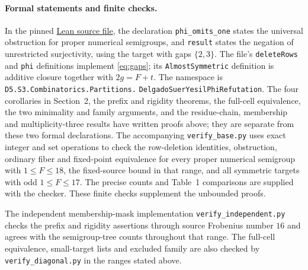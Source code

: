 \documentclass[11pt,a4paper]{article}
\theoremstyle{definition}
\theoremstyle{remark}
\begin{document}
\paragraph{Formal statements and finite checks.}
In the pinned \href{https://github.com/the-omega-institute/trureturing/blob/f960cb09514c99f42fd07398f5240a77378ea4db/D5/S3/Combinatorics/Partitions/DelgadoSuerYesilPhiRefutation.lean}{Lean source file},
the declaration \texttt{phi\_omits\_one} states the universal obstruction for
proper numerical semigroups, and \texttt{result} states the negation of
unrestricted surjectivity, using the target with gaps $\{2,3\}$.
The file's \texttt{deleteRows} and \texttt{phi} definitions implement
\eqref{eq:gaps}; its \texttt{AlmostSymmetric} definition is additive closure
together with $2g=F+t$. The namespace is
\texttt{D5.S3.Combinatorics.Partitions.}\allowbreak
\texttt{DelgadoSuerYesilPhiRefutation}.
The four corollaries in Section~2, the prefix and rigidity theorems,
the full-cell equivalence, the two minimality and family arguments,
and the residue-chain, membership and multiplicity-three results
have written proofs above; they are separate from these two formal declarations.
The accompanying \texttt{verify\_base.py} uses exact integer and set operations to
check the row-deletion identities, obstruction, ordinary fiber and fixed-point
equivalence for every proper numerical semigroup with $1\leq F\leq18$,
the fixed-source bound in that range, and all symmetric targets with odd
$1\leq F\leq17$. The precise counts and Table~1 comparisons are supplied
with the checker. These finite checks supplement the unbounded proofs.


The independent membership-mask implementation
\texttt{verify\_independent.py} checks the prefix and rigidity assertions
through source Frobenius number $16$ and agrees with the semigroup-tree
counts throughout that range. The full-cell equivalence, small-target lists
and excluded family are also checked by \texttt{verify\_diagonal.py} in
the ranges stated above.
\end{document}
